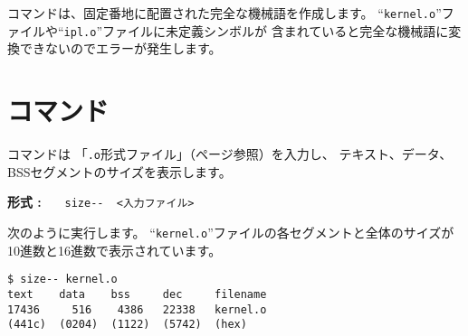 {\objbin}コマンドは、固定番地に配置された完全な機械語を作成します。
``\verb/kernel.o/''ファイルや``\verb/ipl.o/''ファイルに未定義シンボルが
含まれていると完全な機械語に変換できないのでエラーが発生します。

%

\section{{\size}コマンド}

{\size}コマンドは
「\verb/.o/形式ファイル」（\pageref{app:oformat}ページ参照）を入力し、
テキスト、データ、BSSセグメントのサイズを表示します。

\begin{flushleft}
{\bf 形式 : }~~~\verb/size--  <入力ファイル>/
\end{flushleft}

次のように実行します。
``\verb/kernel.o/''ファイルの各セグメントと全体のサイズが
10進数と16進数で表示されています。

\begin{mylist}
\begin{verbatim}
$ size-- kernel.o
text    data    bss     dec     filename
17436     516    4386   22338   kernel.o
(441c)  (0204)  (1122)  (5742)  (hex)
\end{verbatim}
\end{mylist}
